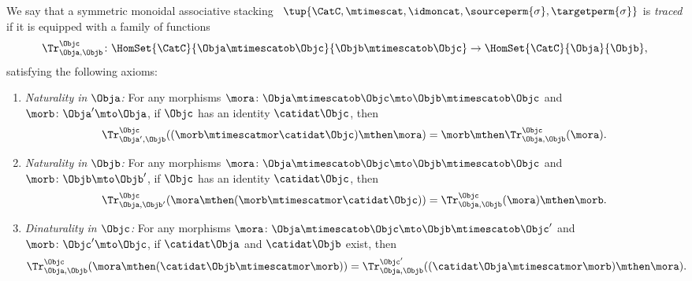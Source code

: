 {\begin{widepar}
    \begin{ctdefinition}
        \label{def:traced-sym-strict-mon-scat}
        We say that a symmetric monoidal associative stacking ~$\tup{\CatC, \mtimescat, \idmoncat, \sourceperm{\sigma}, \targetperm{\sigma} }$ is \emph{traced} if it is equipped with a family of functions
        \begin{equation}
            \Tr_{\Obja,\Objb}^\Objc\colon \HomSet{\CatC}{\Obja \mtimescatob \Objc}{\Objb\mtimescatob \Objc}\to \HomSet{\CatC}{\Obja}{\Objb},
        \end{equation}
        satisfying the following axioms:
        \begin{enumerate}

            \item \emph{Naturality in $\Obja$:} For any morphisms $\mora\colon \Obja\mtimescatob \Objc \mto \Objb\mtimescatob \Objc$ and $\morb \colon \Obja' \mto \Obja$, if $\Objc$ has an identity $\catidat\Objc$, then
                  \begin{equation}
                      \Tr_{\Obja', \Objb}^\Objc ( (\morb \mtimescatmor \catidat\Objc) \mthen \mora) = \morb \mthen \Tr_{\Obja, \Objb}^\Objc (\mora).
                  \end{equation}

            \item \emph{Naturality in $\Objb$:}
                  For any morphisms $\mora\colon \Obja\mtimescatob \Objc \mto \Objb\mtimescatob \Objc$ and $\morb \colon \Objb \mto \Objb'$, if $\Objc$ has an identity $\catidat\Objc$, then
                  \begin{equation}
                      \Tr_{\Obja, \Objb'}^\Objc ( \mora \mthen (\morb \mtimescatmor \catidat\Objc) ) = \Tr_{\Obja, \Objb}^\Objc (\mora) \mthen \morb.
                  \end{equation}

            \item \emph{Dinaturality in $\Objc$:}
                  For any morphisms $\mora \colon \Obja \mtimescatob \Objc \mto \Objb \mtimescatob \Objc'$ and $\morb \colon \Objc' \mto \Objc$, if $\catidat\Obja$ and $\catidat\Objb$ exist, then
                  \begin{equation}
                      \Tr_{\Obja, \Objb}^{\Objc} (\mora \mthen (\catidat\Objb \mtimescatmor \morb)) = \Tr_{\Obja, \Objb}^{\Objc'}((\catidat\Obja \mtimescatmor \morb) \mthen \mora).
                  \end{equation}


\end{enumerate}
\end{ctdefinition}
\end{widepar}}

